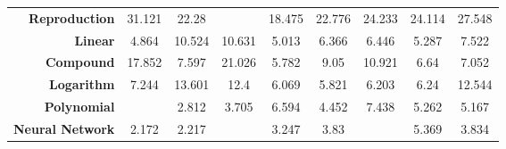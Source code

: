\begin{table}[H]
\begin{center}
\begin{tabularx}{\textwidth}{r c c c c c c c c}
        \textbf{Reproduction} &31.121 &22.28 &\cellcolor{colorgreen}{5.415} &18.475 &22.776 &24.233 &24.114 &27.548\\ 
        \textbf{Linear} &4.864 &10.524 &10.631 &5.013 &6.366 &6.446 &5.287 &7.522\\ 
        \textbf{Compound} &17.852 &7.597 &21.026 &5.782 &9.05 &10.921 &6.64 &7.052\\ 
        \textbf{Logarithm} &7.244 &13.601 &12.4 &6.069 &5.821 &6.203 &6.24 &12.544\\ 
        \textbf{Polynomial} &\cellcolor{colorgreen}{2.576} &2.812 &3.705 &6.594 &4.452 &7.438 &5.262 &5.167\\ 
        \textbf{Neural Network} &2.172 &2.217 &\cellcolor{colorgreen}{1.098} &3.247 &3.83 &\cellcolor{colorred}{6.565} &5.369 &3.834\\ \midrule 
    \bottomrule
    \end{tabularx}
  \end{center}
\end{table}
